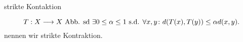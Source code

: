 \documentclass[class=article, crop=false]{standalone}
\begin{document}
\begin{zettel}{strikte Kontaktion}
\begin{flashcard}
    \begin{definition}
    \[
        T : X \longrightarrow X \text{ Abb. sd } \exists  0 \leq \alpha \leq  1 \text{ s.d. } \forall x,y \colon d(T(x) ,T(y) ) \leq \alpha d(x,y)   
    .\]
    nennen wir strikte Kontraktion.
    \end{definition}
\end{flashcard}
\end{zettel}
\end{document}
